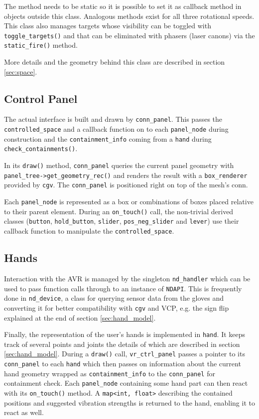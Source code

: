 \documentclass[hyperref, bachelorofscience]{cgvpub}
\begin{document}
The method needs to be static so it is possible to set it as callback method in objects outside this class. Analogous methods exist for all three rotational speeds. This class also manages targets whose visibility can be toggled with \lstinline|toggle_targets()| and that can be eliminated with phasers (laser canons) via the \lstinline|static_fire()| method. 

More details and the geometry behind this class are described in section \ref{sec:space}.

\subsection{Control Panel}
The actual interface is built and drawn by \lstinline|conn_panel|. This passes the \lstinline|controlled_space| and a callback function on to each \lstinline|panel_node| during construction and the \lstinline|containment_info| coming from a \lstinline|hand| during \lstinline|check_containments()|. 

In its \lstinline|draw()| method, \lstinline|conn_panel| queries the current panel geometry with \lstinline|panel_tree->get_geometry_rec()| and renders the result with a \lstinline|box_renderer| provided by \lstinline|cgv|. The \lstinline|conn_panel| is positioned right on top of the mesh's conn.

Each \lstinline|panel_node| is represented as a box or combinations of boxes placed relative to their parent element. During an \lstinline|on_touch()| call, the non-trivial derived classes (\lstinline|button|, \lstinline|hold_button|, \lstinline|slider|, \lstinline|pos_neg_slider| and \lstinline|lever|) use their callback function to manipulate the \lstinline|controlled_space|. 

\subsection{Hands} \label{sec:devel:structure:hands}
Interaction with the \Gls{AVR} is managed by the singleton \lstinline|nd_handler| which can be used to pass function calls through to an instance of \lstinline|NDAPI|. This is frequently done in \lstinline|nd_device|, a class for querying sensor data from the gloves and converting it for better compatibility with \lstinline|cgv| and \gls{VCP}, e.g. the sign flip explained at the end of section \ref{sec:hand_model}.

Finally, the representation of the user's hands is implemented in \lstinline|hand|. It keeps track of several points and joints the details of which are described in section \ref{sec:hand_model}. During a \lstinline|draw()| call, \lstinline|vr_ctrl_panel| passes a pointer to its \lstinline|conn_panel| to each \lstinline|hand| which then passes on information about the current hand geometry wrapped as \lstinline|containment_info| to the \lstinline|conn_panel| for containment check. Each \lstinline|panel_node| containing some hand part can then react with its \lstinline|on_touch()| method. A \lstinline|map<int, float>| describing the contained positions and suggested vibration strengths is returned to the hand, enabling it to react as well.
\end{document}
